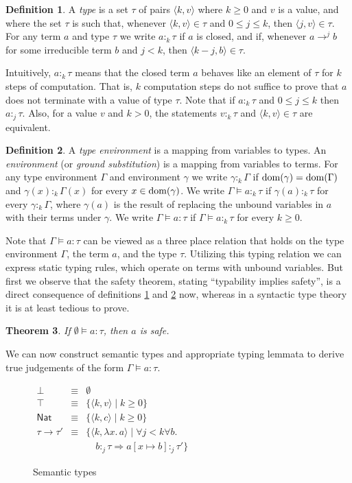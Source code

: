 \documentclass[10pt,a4paper,final,twocolumn]{article}
\theoremstyle{definition}
\newtheorem{definition}{Definition}
\theoremstyle{plain}
\newtheorem{theorem}[definition]{Theorem}
\newcommand{\abstr}[2]{\ensuremath{\lambda{#1}.\,{#2}}}
\newcommand{\Nat}{\ensuremath{\mathsf{Nat}}}
\newcommand{\pair}[1]{\ensuremath{\langle{#1}\rangle}}
\begin{document}
\begin{definition} \label{def:Type}
  A \emph{type} is a set $\tau$ of pairs $\pair{k,v}$ where $k \ge 0$ and $v$ is a value, and where the
  set $\tau$ is such that, whenever $\pair{k,v} \in \tau$ and $0 \le j \le k$, then $\pair{j,v} \in \tau$.
  For any term $a$ and type $\tau$ we write $a :_k \tau$ if $a$ is closed, and if, whenever $a \to^j b$ for some
  irreducible term $b$ and $j < k$, then $\pair{k-j,b} \in \tau$.
\end{definition}
Intuitively, $a :_k \tau$ means that the closed term $a$ behaves like an element of $\tau$ for $k$ steps
of computation. That is, $k$ computation steps do not suffice to prove that $a$ does not terminate with
a value of type $\tau$. Note that if $a :_k \tau$ and $0 \le j \le k$ then $a :_j \tau$. Also, for a value
$v$ and $k > 0$, the statements $v :_k \tau$ and $\pair{k,v} \in \tau$ are equivalent.
\begin{definition} \label{def:Typing}
  A \emph{type environment} is a mapping from variables to types. An \emph{environment}
  (or \emph{ground substitution}) is a mapping from variables to terms. For any type environment
  $\Gamma$ and environment $\gamma$ we write \mbox{$\gamma :_k \Gamma$} if \mbox{$\operatorname{dom}(\gamma) = \operatorname{dom}(\Gamma)$} and
  \mbox{$\gamma(x) :_k \Gamma(x)$} for every \mbox{$x \in \operatorname{dom}(\gamma)$}. We write \mbox{$\Gamma \models a :_k \tau$}
  if \mbox{$\gamma(a) :_k \tau$} for every \mbox{$\gamma :_k \Gamma$}, where $\gamma(a)$ is the result of replacing
  the unbound variables in $a$ with their terms under $\gamma$. We write \mbox{$\Gamma \models a : \tau$} if
  \mbox{$\Gamma \models a :_k \tau$} for every \mbox{$k \ge 0$}.
\end{definition}
Note that \mbox{$\Gamma \models a : \tau$} can be viewed as a three place relation that holds on the
type environment $\Gamma$, the term $a$, and the type $\tau$. Utilizing this typing relation
we can express static typing rules, which operate on terms with unbound variables. But first
we observe that the safety theorem, stating ``typability implies safety'', is a direct consequence
of definitions \ref{def:Type} and \ref{def:Typing} now, whereas in a syntactic type theory
it is at least tedious to prove.
\begin{theorem}
  If \mbox{$\emptyset \models a : \tau$}, then $a$ is safe.
\end{theorem}
We can now construct semantic types and appropriate typing lemmata to derive true judgements of the
form \mbox{$\Gamma \models a : \tau$}.
\begin{figure}[htb]
  \centering
  $\begin{array}{rcl}
    \bot &\equiv& \emptyset \\
    \top &\equiv& \{ \pair{k,v} \mid k \ge 0 \} \\
    \Nat &\equiv& \{ \pair{k,c} \mid k \ge 0 \} \\
    \tau \to \tau' &\equiv& \{ \pair{k,\abstr{x}{a}} \mid \forall j < k \forall b.\, \\
    && \quad b :_j \tau \Rightarrow a[x \mapsto b] :_j \tau' \}
    \end{array}$
  \caption{Semantic types}
  \label{fig:Semantic_types}
\end{figure}
\end{document}
